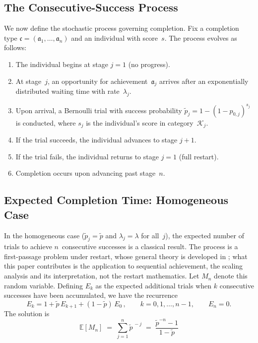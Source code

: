 \documentclass{article}
\begin{document}
\subsection{The Consecutive-Success Process}\label{ssec:process}

We now define the stochastic process governing completion. Fix a
completion type $\mathfrak{c} = (\mathfrak{a}_1, \ldots, \mathfrak{a}_n)$
and an individual with score~$s$. The process evolves as follows:
\begin{enumerate}
  \item
    The individual begins at stage $j = 1$ (no progress).
  \item
    At stage~$j$, an opportunity for achievement~$\mathfrak{a}_j$ arrives
    after an exponentially distributed waiting time with rate~$\lambda_j$.
  \item
    Upon arrival, a Bernoulli trial with success probability
    $\widetilde{p}_j = 1 - (1 - p_{0,j})^{s_j}$ is conducted, where
    $s_j$ is the individual's score in category~$\mathcal{K}_j$.
  \item
    If the trial succeeds, the individual advances to stage $j+1$.
  \item
    If the trial fails, the individual returns to stage $j = 1$
    (full restart).
  \item
    Completion occurs upon advancing past stage~$n$.
\end{enumerate}

\subsection{Expected Completion Time: Homogeneous Case}\label{ssec:time}

In the homogeneous case ($\widetilde{p}_j = \widetilde{p}$ and
$\lambda_j = \lambda$ for all~$j$), the expected number of trials to achieve $n$~consecutive successes is a classical result. The process is a first-passage problem under restart, whose general theory is developed in \cite{pal2017firstpassage}; what this paper contributes is the application to sequential achievement, the scaling analysis and its interpretation, not the restart mathematics. Let $M_n$ denote
this random variable. Defining $E_k$ as the expected additional trials
when $k$ consecutive successes have been accumulated, we have the
recurrence
\begin{equation}\label{eq:recurrence}
  E_k = 1 + \widetilde{p}\,E_{k+1} + (1-\widetilde{p})\,E_0\,,
  \qquad k = 0, 1, \ldots, n-1,
  \qquad E_n = 0.
\end{equation}
The solution is \cite{feller1968}
\begin{equation}\label{eq:expected-trials}
  \boxed{\;
    \mathbb{E}[M_n]
    \;=\;
    \sum_{j=1}^{n} \widetilde{p}^{\,-j}
    \;=\;
    \frac{\widetilde{p}^{-n} - 1}{1 - \widetilde{p}}
  \;}
\end{equation}
\end{document}
